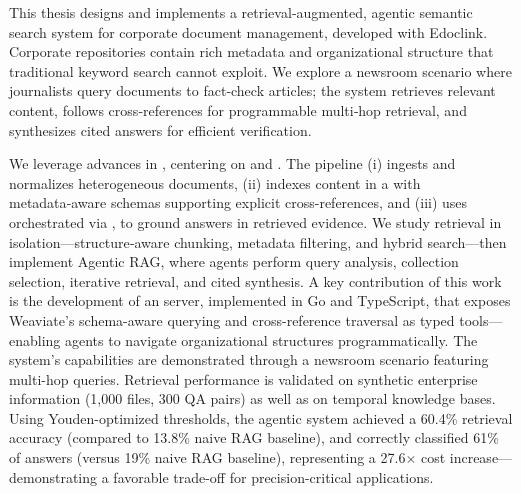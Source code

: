 \glsresetall
\noindent  
This thesis designs and implements a retrieval‑augmented, agentic semantic search system for corporate document management, developed with Edoclink. Corporate repositories contain rich metadata and organizational structure that traditional keyword search cannot exploit. We explore a newsroom scenario where journalists query documents to fact‑check articles; the system retrieves relevant content, follows cross‑references for programmable multi‑hop retrieval, and synthesizes cited answers for efficient verification.

We leverage advances in , centering on  and . The pipeline (i) ingests and normalizes heterogeneous documents, (ii) indexes content in a  with metadata‑aware schemas supporting explicit cross-references, and (iii) uses  orchestrated via , to ground answers in retrieved evidence. We study retrieval in isolation—structure‑aware chunking, metadata filtering, and hybrid search—then implement Agentic RAG, where agents perform query analysis, collection selection, iterative retrieval, and cited synthesis.
A key contribution of this work is the development of an  server, implemented in Go and TypeScript, that exposes Weaviate's schema-aware querying and cross-reference traversal as typed tools—enabling agents to navigate organizational structures programmatically. The system's capabilities are demonstrated through a newsroom scenario featuring multi-hop queries. Retrieval performance is validated on synthetic enterprise information (1,000 files, 300 QA pairs) as well as on temporal knowledge bases. Using Youden-optimized thresholds, the agentic system achieved a 60.4\% retrieval accuracy (compared to 13.8\% naive \gls{RAG} baseline), and correctly classified 61\% of answers (versus 19\% naive \gls{RAG} baseline), representing a 27.6× cost increase—demonstrating a favorable trade-off for precision-critical applications.